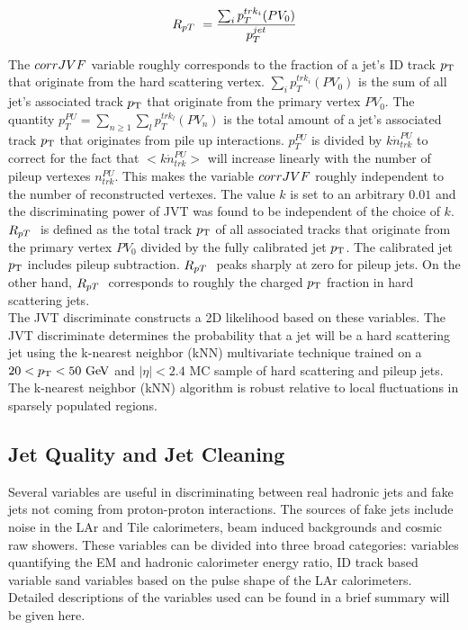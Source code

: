 \begin{equation}
R_{pT}\  = \frac{\sum_i p_T^{trk_i} (PV_0) }{ p_T^{jet} }
\label{eqn:RpT}
\end{equation}

\indent The $corrJVF$ variable roughly corresponds to the fraction of a jet's ID track $p_{\mathrm{T}}$ that originate from the hard scattering vertex.  $\sum_i p_T^{trk_i} (PV_0)$ is the sum of all jet's associated track $p_{\mathrm{T}}$ that originate from the primary vertex $PV_0$.  The quantity $p^{PU}_T = \sum_{n\ge1} \sum_l p_T^{trk_l} (PV_n)$ is the total amount of a jet's associated track $p_{\mathrm{T}}$ that originates from pile up interactions.  $p^{PU}_T$ is divided by $k\dot n^{PU}_{trk}$ to correct for the fact that $<k\dot n^{PU}_{trk}>$ will increase linearly with the number of pileup vertexes $n^{PU}_{trk}$.  This makes the variable $corrJVF$ roughly independent to the number of reconstructed vertexes. The value $k$ is set to an arbitrary $0.01$ and the discriminating power of JVT was found to be independent of the choice of $k$.\\

\indent $R_{pT}\ $ is defined as the total track $p_{\mathrm{T}}$ of all associated tracks that originate from the primary vertex $PV_0$ divided by the fully calibrated jet $p_{\mathrm{T}}$. The calibrated jet $p_{\mathrm{T}}$ includes pileup subtraction.  $R_{pT}\ $ peaks sharply at zero for pileup jets.  On the other hand, $R_{pT}\ $ corresponds to roughly the charged $p_{\mathrm{T}}$ fraction in hard scattering jets.  \\

\indent The JVT discriminate constructs a 2D likelihood based on these variables.   The JVT discriminate determines the probability that a jet will be a hard scattering jet using the k-nearest neighbor (kNN) multivariate technique \cite{TMVA} trained on a $20<\pt<50 \gev$ and $|\eta|<2.4$ MC sample of hard scattering and pileup jets.  The k-nearest neighbor (kNN) algorithm is robust relative to local fluctuations in sparsely populated regions.  \\

\subsection{Jet Quality and Jet Cleaning}
\label{sec:jet:quality}

\indent Several variables are useful in discriminating between real hadronic jets and fake jets not coming from proton-proton interactions.  The sources of fake jets include noise in the LAr and Tile calorimeters, beam induced backgrounds and cosmic raw showers.  These variables can be divided into three broad categories: variables quantifying the EM and hadronic calorimeter energy ratio, ID track based variable sand variables based on the pulse shape of the LAr calorimeters.  Detailed descriptions of the variables used can be found in \cite{JetCleaning} a brief summary will be given here.\\

